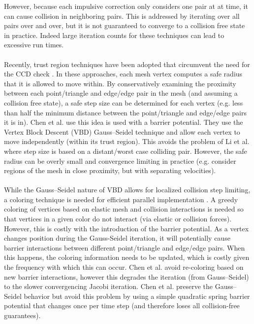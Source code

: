 \documentclass[acmtog,anonymous,review]{acmart}
\begin{document}
However, because each impulsive correction only considers one pair at at time, it can cause collision in neighboring pairs.
This is addressed by iterating over all pairs over and over, but it is not guaranteed to converge to a collision free state in practice.
Indeed large iteration counts for these techniques can lead to excessive run times.\\
\\
Recently, trust region techniques have been adopted that circumvent the need for the CCD check \cite{wu2020repulsion,chen2025ogc}.
In these approaches, each mesh vertex computes a safe radius that it is allowed to move within.
By conservatively examining the proximity between each point/triangle and edge/edge pair in the mesh (and assuming a collision free state), a safe step size can be determined for each vertex (e.g. less than half the minimum distance between the point/triangle and edge/edge pairs it is in).
Chen et al.  use this idea is used with a barrier potential. 
They use the Vertex Block Descent (VBD) Gauss--Seidel technique  and allow each vertex to move independently (within its trust region).
This avoids the problem of Li et al.  where step size is based on a distant/worst case colliding pair.
However, the safe radius can be overly small and convergence limiting in practice (e.g. consider regions of the mesh in close proximity, but with separating velocities).\\
\\
While the Gauss--Seidel nature of VBD allows for localized collision step limiting,  a coloring technique is needed for efficient parallel implementation \cite{chen2024xpbd,chen2024vbd}.
A greedy coloring of vertices based on elastic mesh and collision interactions is needed so that vertices in a given color do not interact (via elastic or collision forces).
However, this is costly with the introduction of the barrier potential.
As a vertex changes position during the Gauss-Seidel iteration, it will potentially cause barrier interactions between different point/triangle and edge/edge pairs.
When this happens, the coloring information needs to be updated, which is costly given the frequency with which this can occur.
Chen et al.  avoid re-coloring based on new barrier interactions, however this degrades the iteration (from Gauss--Seidel) to the slower convergencing Jacobi iteration.
Chen et al.  preserve the Gauss--Seidel behavior but avoid this problem by using a simple quadratic spring barrier potential that changes once per time step (and therefore loses all collision-free guarantees).
\end{document}
